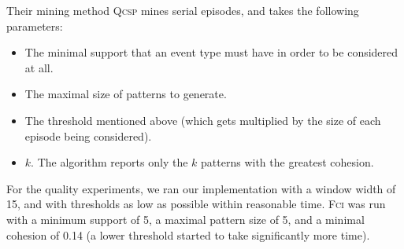 Their mining method \textsc{Qcsp} mines serial episodes, and takes the following parameters:
\begin{itemize}
\item The minimal support that an event type must have in order to be considered at all.
\item The maximal size of patterns to generate.
\item The threshold mentioned above (which gets multiplied by the size of each episode being considered).
\item $ k $. The algorithm reports only the $ k $ patterns with the greatest cohesion.
\end{itemize}

For the quality experiments, we ran our implementation with a window width of 15, and with thresholds as low as possible within reasonable time. \textsc{Fci} was run with a minimum support of 5, a maximal pattern size of 5, and a minimal cohesion of 0.14 (a lower threshold started to take significantly more time).

